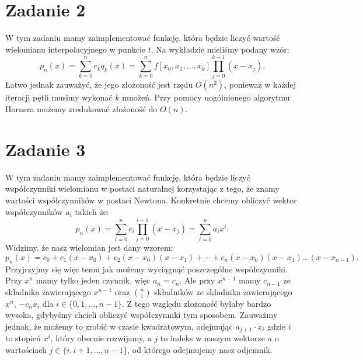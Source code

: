 \documentclass{article}
\begin{document}
\section*{Zadanie 2}
W tym zadaniu mamy zaimplementować funkcję, która będzie liczyć wartość
wielomianu interpolacyjnego w punkcie $t$. Na wykładzie mieliśmy podany wzór:
\[
p_n(x) = \sum_{k=0}^{n} c_k q_k(x) = \sum_{k=0}^{n} f[x_0, x_1, \ldots, x_k] \prod_{j=0}^{k-1} (x - x_j).
\]
Łatwo jednak zauważyć, że jego złożoność jest rzędu $O(n^2)$, ponieważ
w każdej iteracji pętli musimy wykonać $k$ mnożeń. Przy pomocy
uogólnionego algorytmu Hornera możemy zredukować złożoność do $O(n)$.
\begin{algorithm}[h]
    \SetAlgoLined
    
\end{algorithm}

\section*{Zadanie 3}
W tym zadaniu mamy zaimplementować funkcję, która będzie liczyć
współczynniki wielomianu w postaci naturalnej korzystając
z tego, że znamy wartości współczynników w postaci Newtona.
Konkretnie chcemy obliczyć wektor współczynników $a_i$ takich że:
\[
p_n(x) = \sum_{i=0}^{n} c_i \prod_{j=0}^{i-1} (x - x_j) = \sum_{i=0}^{n} a_i x^i.
\]
Widzimy, że nasz wielomian jest dany wzorem:
\[
p_n(x) = c_0 + c_1(x - x_0) + c_2(x - x_0)(x - x_1) + \cdots + c_n(x - x_0)(x - x_1)\dots(x - x_{n-1}).
\]
Przyjrzyjmy się więc temu jak możemy wyciągnąć poszczególne współczynniki.
Przy $x^n$ mamy tylko jeden czynnik, więc $a_n = c_n$. Ale przy $x^{n-1}$
mamy $c_{n-1}$ ze składnika zawierającego $x^{n-1}$ oraz $n \choose 1$
składników ze składnika zawierającego $x^n$,
$-c_{n}x_{i}$ dla $i \in \{0, 1, \dots, n-1\}$. Z tego względu złożoność
byłaby bardzo wysoka, gdybyśmy chcieli obliczyć współczynniki tym sposobem.
Zauważmy jednak, że możemy to zrobić w czasie kwadratowym, odejmując
$a_{j+1} \cdot x_i$ gdzie $i$ to stopień $x^i$, który obecnie rozwijamy,
a $j$ to indeks w naszym wektorze $a$ o wartościach $j \in \{i, i+1, \dots, n-1\}$,
od którego odejmujemy nasz odjemnik.
\end{document}

